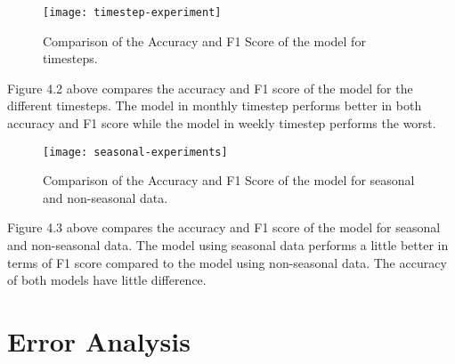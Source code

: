     \begin{figure}[H]
    \centering
    \texttt{[image: timestep-experiment]}
    \caption{Comparison of the Accuracy and F1 Score of the model for timesteps.}
    \end{figure}
    Figure 4.2 above compares the accuracy and F1 score of the model for the different timesteps. The model in monthly timestep performs better in both accuracy and F1 score while the model in weekly timestep performs the worst.
    
    \begin{figure}[H]
    \centering
    \texttt{[image: seasonal-experiments]}
    \caption{Comparison of the Accuracy and F1 Score of the model for seasonal and non-seasonal data.}
    \end{figure}
    Figure 4.3 above compares the accuracy and F1 score of the model for seasonal and non-seasonal data. The model using seasonal data performs a little better in terms of F1 score compared to the model using non-seasonal data. The accuracy of both models have little difference.

\section{Error Analysis}
